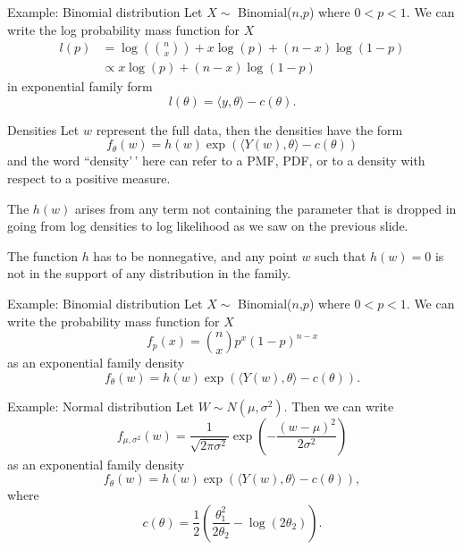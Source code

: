 \documentclass[
  ignorenonframetext,
]{beamer}
\begin{document}
\begin{frame}{Example: Binomial distribution}
\protect\hypertarget{example-binomial-distribution}{}
Let \(X \sim\) Binomial(\(n\),\(p\)) where \(0 < p < 1\). We can write
the log probability mass function for \(X\) \begin{align*}
  l(p) &= \log\left({n \choose x}\right) +  x\log(p) + (n-x)\log(1-p) \\
       &\propto  x\log(p) + (n-x)\log(1-p) 
\end{align*} in exponential family form \[
  l(\theta) = \langle y,\theta \rangle - c(\theta).
\]
\end{frame}

\begin{frame}{Densities}
\protect\hypertarget{densities}{}
Let \(w\) represent the full data, then the densities have the form
\begin{equation} \label{expodens}
  f_\theta(w) = h(w)\exp\left(\langle Y(w),\theta\rangle - c(\theta)\right)
\end{equation} and the word ``density'\,' here can refer to a PMF, PDF,
or to a density with respect to a positive measure.

The \(h(w)\) arises from any term not containing the parameter that is
dropped in going from log densities to log likelihood as we saw on the
previous slide.

The function \(h\) has to be nonnegative, and any point \(w\) such that
\(h(w) = 0\) is not in the support of any distribution in the family.
\end{frame}

\begin{frame}{Example: Binomial distribution}
\protect\hypertarget{example-binomial-distribution-1}{}
Let \(X \sim\) Binomial(\(n\),\(p\)) where \(0 < p < 1\). We can write
the probability mass function for \(X\) \[
  f_p(x) = {n \choose x}p^x(1-p)^{n-x}
\] as an exponential family density \[
 f_{\theta}(w) = h(w)\exp\left( \langle Y(w),\theta \rangle - c(\theta)\right).
\]
\end{frame}

\begin{frame}{Example: Normal distribution}
\protect\hypertarget{example-normal-distribution}{}
Let \(W \sim N(\mu, \sigma^2)\). Then we can write \[
    f_{\mu,\sigma^2}(w) = \frac{1}{\sqrt{2\pi\sigma^2}}\exp\left(-\frac{(w-\mu)^2}{2\sigma^2}\right) 
\] as an exponential family density \[
 f_{\theta}(w) = h(w)\exp\left( \langle Y(w),\theta \rangle - c(\theta)\right),
\] where \[
  c(\theta) = \frac{1}{2}\left(\frac{\theta_1^2}{2\theta_2} - \log(2\theta_2)\right).
\]
\end{frame}
\end{document}
